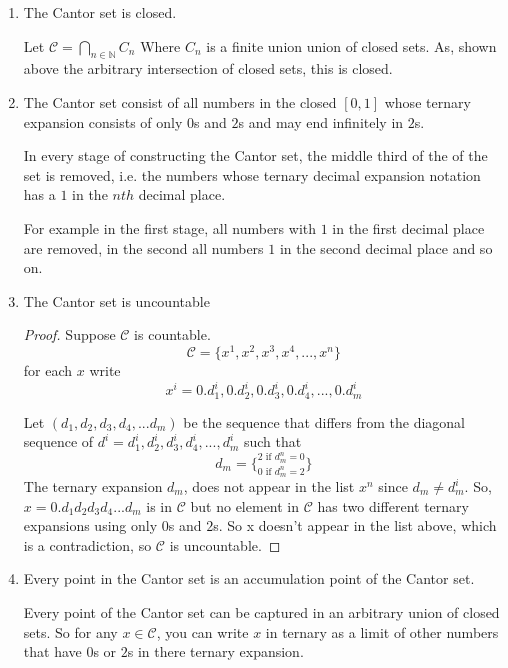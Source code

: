 \documentclass{tufte-book}
\theoremstyle{mytheoremstyle}
\theoremstyle{mylemstyle}
\theoremstyle{mydefstyle}
\begin{document}
\begin{enumerate}

\item The Cantor set is closed.

Let $\mathcal{C} = \bigcap\limits_{n \in \mathbb{N}}C_n$ Where $C_n$ is a finite union union of closed sets.  As, shown above the arbitrary intersection of closed sets, this is closed.

\item The Cantor set consist of all  numbers in the closed $[0,1]$ whose ternary expansion consists of only $0$s and $2$s and may end infinitely in $2$s.

In every stage of constructing the Cantor set, the middle third of the of the set is removed, i.e. the numbers whose ternary decimal expansion notation has a $1$ in the $nth$ decimal place.

For example in the first stage, all numbers with $1$ in the first decimal place are removed, in the second all numbers $1$ in the second decimal place and so on.

\item The Cantor set is uncountable

\begin{proof}
Suppose $\mathcal{C}$ is countable.
\[\mathcal{C} = \{x^1, x^2, x^3, x^4, ..., x^n\}\]
for each $x$ write
\[x^i = 0.d_1^i,0.d_2^i,0.d_3^i,0.d_4^i,...,0.d_m^i \]

Let $(d_1, d_2, d_3, d_4,...d_m)$ be the sequence that differs from the diagonal sequence of $d^i= d_1^i, d_2^i, d_3^i, d_4^i,...,d_m^i$ such that
\[d_m = \{_{0 \text{ if } d^n_m = 2}^{2 \text{ if } d^n_m = 0} \}\]
The ternary expansion $d_m$, does not appear in the list $x^n$ since $d_m \neq d_m^i$.  So, $x=0.d_1d_2d_3d_4...d_m$ is in $\mathcal{C}$ but no element in $\mathcal{C}$ has two different ternary expansions using only $0$s and $2$s. So x doesn't appear in the list above, which is a contradiction, so $\mathcal{C}$ is uncountable.

\end{proof}


\item Every point in the Cantor set is an accumulation point of the Cantor set.

Every point of the Cantor set can be captured in an arbitrary union of closed sets.  So for any $x \in \mathcal{C}$, you can write $x$ in ternary as a limit of other numbers that have $0$s or $2$s in there ternary expansion.


\end{enumerate}
\end{document}

